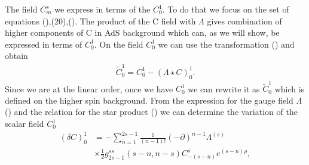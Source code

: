 \documentclass[prd,superscriptaddress,twocolumn,10pt]{revtex4}
\begin{document}
The field $C_m^s$ we express in terms of the $C_0^1$.
To do that we focus on the set of equations (),(20),().
The product of the C field with $\Lambda$ gives combination of higher components of C in AdS background which can, as we will show, be expressed in terms of $C_0^1$. On the field $C_0^1$ we can use the transformation () and obtain 
\begin{align}
\tilde{C}_0^1=C_0^1-(\Lambda\star C)^1_0.
\end{align}
Since we are at the linear order, once we have $C_0^1$ we can rewrite it as $\tilde{C}_0^1$ which is defined on the higher spin background. 
From the expression for the gauge field $\Lambda$ () and the relation for the star product () we can determine the variation of the scalar field $C^1_0$
\begin{align}
(\delta C)^1_0 &=-\sum_{n=1}^{2s-1}\frac{1}{(n-1)!}(-\partial)^{n-1}\Lambda^{(s)} \\ &\times\frac{1}{2}g_{2s-1}^{ss}(s-n,n-s)C^s_{-(s-n)}e^{(s-n)\rho}, 
\end{align}
\end{document}
